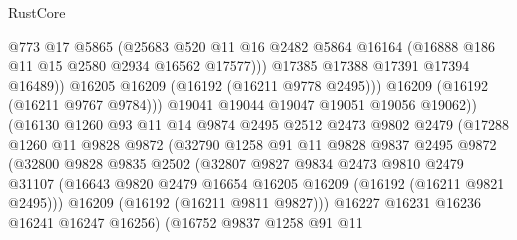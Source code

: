 \begin{lexlean}{RustCore}
\begin{coremodule}
                                @773
                                @17
                                @5865
                                (@25683
                                  @520
                                  @11
                                  @16
                                  @2482
                                  @5864
                                  @16164
                                  (@16888 @186 @11 @15 @2580 @2934 @16562 @17577)))
                              @17385
                              @17388
                              @17391
                              @17394
                              @16489))
                          @16205
                          @16209
                          (@16192 (@16211 @9778 @2495)))
                        @16209
                        (@16192 (@16211 @9767 @9784)))
                      @19041
                      @19044
                      @19047
                      @19051
                      @19056
                      @19062))
                  (@16130
                    @1260
                    @93
                    @11
                    @14
                    @9874
                    @2495
                    @2512
                    @2473
                    @9802
                    @2479
                    (@17288
                      @1260
                      @11
                      @9828
                      @9872
                      (@32790
                        @1258
                        @91
                        @11
                        @9828
                        @9837
                        @2495
                        @9872
                        (@32800
                          @9828
                          @9835
                          @2502
                          (@32807
                            @9827
                            @9834
                            @2473
                            @9810
                            @2479
                            @31107
                            (@16643 @9820 @2479 @16654 @16205 @16209 (@16192 (@16211 @9821 @2495)))
                            @16209
                            (@16192 (@16211 @9811 @9827)))
                          @16227
                          @16231
                          @16236
                          @16241
                          @16247
                          @16256)
                        (@16752
                          @9837
                          @1258
                          @91
                          @11

\end{coremodule}
\end{lexlean}
